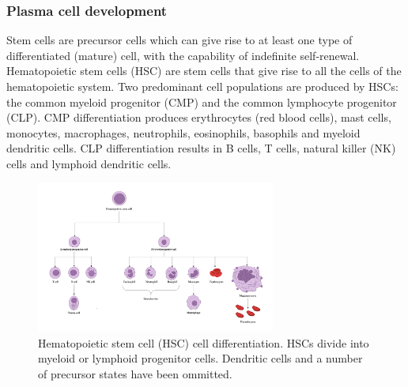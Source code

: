 \subsubsection{Plasma cell development}
Stem cells are precursor cells which can give rise to at least one type of differentiated (mature) cell, with the capability of indefinite self-renewal.
Hematopoietic stem cells (HSC) are stem cells that give rise to all the cells of the hematopoietic system.
Two predominant cell populations are produced by HSCs: the common myeloid progenitor (CMP) and the common lymphocyte progenitor (CLP).
CMP differentiation produces erythrocytes (red blood cells), mast cells, monocytes, macrophages, neutrophils, eosinophils, basophils and myeloid dendritic cells.
CLP differentiation results in B cells, T cells, natural killer (NK) cells and lymphoid dendritic cells.

\begin{figure}
\centering\includegraphics[width=0.7\textwidth]{figures/Introduction/immune_cells.png}
\caption[Hematopoietic system cell differentiation]{Hematopoietic stem cell (HSC) cell differentiation. HSCs divide into myeloid or lymphoid progenitor cells. Dendritic cells and a number of precursor states have been ommitted. }
\label{fig:HSC_differentiation}\end{figure}

